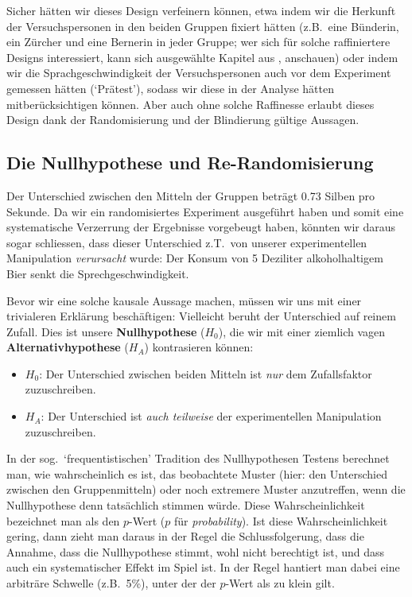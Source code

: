 \documentclass[oneside, 10pt]{book}\usepackage[]{graphicx}\usepackage[]{xcolor}
\begin{document}
Sicher hätten wir dieses Design verfeinern können, etwa indem wir
die Herkunft der Versuchspersonen in den beiden Gruppen fixiert
hätten (z.B.\ eine Bünderin, ein Zürcher und eine Bernerin in jeder
Gruppe; wer sich für solche raffiniertere Designs interessiert,
kann sich ausgewählte Kapitel aus \citealp{Oehlert2010}, anschauen)
oder indem wir die Sprachgeschwindigkeit der Versuchspersonen auch
vor dem Experiment gemessen hätten (`Prätest'), sodass wir diese
in der Analyse hätten mitberücksichtigen können. Aber auch ohne solche
Raffinesse erlaubt dieses Design dank der Randomisierung
und der Blindierung gültige Aussagen.

\subsection{Die Nullhypothese und Re-Randomisierung}
Der Unterschied zwischen den Mitteln der Gruppen beträgt
0.73 Silben pro Sekunde. Da wir ein randomisiertes
Experiment ausgeführt haben und somit eine systematische
Verzerrung der Ergebnisse vorgebeugt haben, könnten wir
daraus sogar schliessen, dass dieser Unterschied z.T.\ von
unserer experimentellen Manipulation \emph{verursacht} wurde:
Der Konsum von 5 Deziliter alkoholhaltigem Bier senkt die
Sprechgeschwindigkeit.

Bevor wir eine solche kausale Aussage machen, müssen wir
uns mit einer trivialeren Erklärung beschäftigen: Vielleicht
beruht der Unterschied auf reinem Zufall. Dies ist unsere
\textbf{Nullhypothese} ($H_0$),
die wir mit einer ziemlich vagen \textbf{Alternativhypothese} ($H_A$)
kontrasieren können:
\begin{itemize}
  \item $H_0$: Der Unterschied zwischen beiden Mitteln ist \emph{nur}
  dem Zufallsfaktor zuzuschreiben.

  \item $H_A$: Der Unterschied ist \emph{auch teilweise} der
  experimentellen Manipulation zuzuschreiben.
\end{itemize}

In der sog.\ `frequentistischen' Tradition des Nullhypothesen Testens
berechnet man, wie wahrscheinlich es ist,
das beobachtete Muster (hier: den Unterschied zwischen den Gruppenmitteln)
oder noch extremere Muster anzutreffen,
wenn die Nullhypothese denn tatsächlich stimmen würde.
Diese Wahrscheinlichkeit bezeichnet man als den $p$-Wert
($p$ für \textit{probability}).
Ist diese Wahrscheinlichkeit gering, dann zieht man
daraus in der Regel die Schlussfolgerung, dass die Annahme, dass die
Nullhypothese stimmt, wohl nicht berechtigt ist,
und dass auch ein systematischer Effekt im Spiel ist.
In der Regel hantiert man dabei eine arbiträre Schwelle (z.B.\ 5\%),
unter der der $p$-Wert als zu klein gilt.
\end{document}

